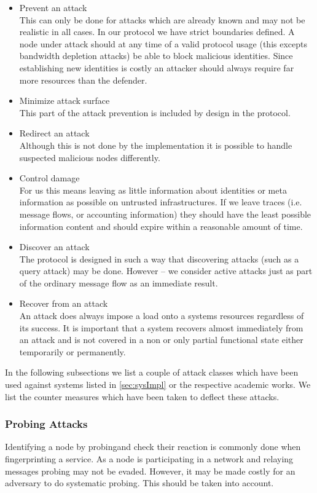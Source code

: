 \begin{itemize}
\item Prevent an attack\\
      This can only be done for attacks which are already known and may not be realistic in all cases. In our protocol we have strict boundaries defined. A node under attack should at any time of a valid protocol usage (this excepts bandwidth depletion attacks) be able to block malicious identities. Since establishing new identities is costly an attacker should always require far more resources than the defender.
\item Minimize attack surface\\
      This part of the attack prevention is included by design in the protocol.
\item Redirect an attack\\
	  Although this is not done by the implementation it is possible to handle suspected malicious nodes differently.
\item Control damage\\
      For us this means leaving as little information about identities or meta information as possible on untrusted infrastructures. If we leave traces (i.e. message flows, or accounting information) they should have the least possible information content and should expire within a reasonable amount of time.
\item Discover an attack\\
      The protocol is designed in such a way that discovering attacks (such as a query attack) may be done. However -- we consider active attacks just as part of the ordinary message flow as an immediate result. 
\item Recover from an attack\\
      An attack does always impose a load onto a systems resources regardless of its success. It is important that a system recovers almost immediately from an attack and is not covered in a non or only partial functional state either temporarily or permanently.
\end{itemize}

In the following subsections we list a couple of attack classes which have been used against systems listed in \ref{sec:sysImpl} or the respective academic works. We list the counter measures which have been taken to deflect these attacks.

\subsubsection{Probing Attacks}
Identifying a node by probingand check their reaction is commonly done when fingerprinting a service. As a node is participating in a network and relaying messages probing may not be evaded. However, it may be made costly for an adversary to do systematic probing. This should be taken into account. 

